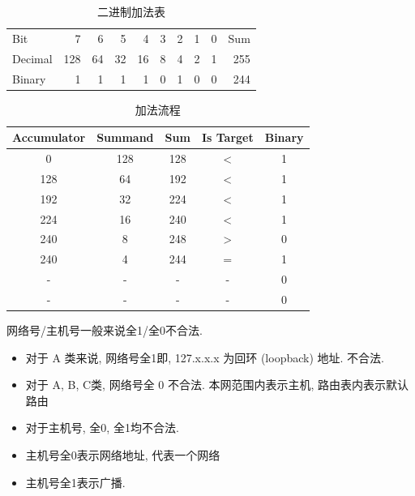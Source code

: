 \documentclass[a4paper]{report}
\begin{document}
\begin{table}[htbp]
  \centering
    \begin{tabular}{|l|rrrrrrrrr|}
    Bit   & 7     & 6     & 5     & 4     & 3     & 2     & 1     & 0     & Sum \\
    Decimal & 128   & 64    & 32    & 16    & 8     & 4     & 2     & 1     & 255 \\
    Binary & 1     & 1     & 1     & 1     & 0     & 1     & 0     & 0     & 244 \\
    \end{tabular}%
  \caption{二进制加法表}
  \label{tab:bin_add_2}%
\end{table}%

\begin{table}[htbp]
  \centering
    \begin{tabular}{ccccc}
      \hline
    Accumulator & Summand & Sum   & Is Target & Binary \\
    \hline
    0     & 128   & 128   & <     & 1 \\
    128   & 64    & 192   & <     & 1 \\
    192   & 32    & 224   & <     & 1 \\
    224   & 16    & 240   & <     & 1 \\
    240   & 8     & 248   & >     & 0 \\
    240   & 4     & 244   & =     & 1 \\
    -     & -     & -     & -     & 0 \\
    -     & -     & -     & -     & 0 \\
    \hline
    \end{tabular}%
  \caption{加法流程}
  \label{tab:bin_add}
\end{table}%

网络号/主机号一般来说全1/全0不合法. 
\begin{itemize}
  \item 对于 A 类来说, 网络号全1即, 127.x.x.x 为回环 (loopback) 地址. 不合法. 
  \item 对于 A, B, C类, 网络号全 0 不合法. 本网范围内表示主机, 路由表内表示默认路由
  \item 对于主机号, 全0, 全1均不合法. 
  \item 主机号全0表示网络地址, 代表一个网络
  \item 主机号全1表示广播. 
\end{itemize}
\end{document}
